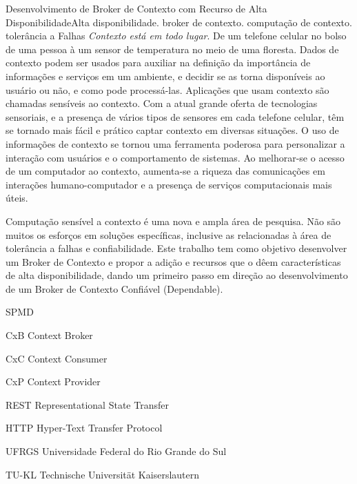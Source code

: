 \documentclass[cic,tc,english]{iiufrgs}
\begin{document}
\begin{englishabstract}{Desenvolvimento de Broker de Contexto com Recurso de Alta Disponibilidade}{Alta disponibilidade. broker de contexto. computação de contexto. tolerância a Falhas}
    \emph{Contexto está em todo lugar}. De um telefone celular no bolso de uma pessoa à um sensor de temperatura no meio de uma floresta. Dados de contexto podem ser usados para auxiliar na definição da importância de informações e serviços em um ambiente, e decidir se as torna disponíveis ao usuário ou não, e como pode processá-las. Aplicações que usam contexto são chamadas sensíveis ao contexto. Com a atual grande oferta de tecnologias sensoriais, e a presença de vários tipos de sensores em cada telefone celular, têm se tornado mais fácil e prático captar contexto em diversas situações. O uso de informações de contexto se tornou uma ferramenta poderosa para personalizar a interação com usuários e o comportamento de sistemas. Ao melhorar-se o acesso de um computador ao contexto, aumenta-se a riqueza das comunicações em interações humano-computador e a presença de serviços computacionais mais úteis.
    
    Computação sensível a contexto é uma nova e ampla área de pesquisa. Não são muitos os esforços em soluções específicas, inclusive as relacionadas à área de tolerância a falhas e confiabilidade.
    Este trabalho tem como objetivo desenvolver um Broker de Contexto e propor a adição e recursos que o dêem características de alta disponibilidade, dando um primeiro passo em direção ao desenvolvimento de um Broker de Contexto  Confiável (Dependable).
\end{englishabstract}

\listoffigures


\begin{listofabbrv}{SPMD}
    \item[CxB] Context Broker
    \item[CxC] Context Consumer
    \item[CxP] Context Provider
    \item[REST] Representational State Transfer
    \item[HTTP] Hyper-Text Transfer Protocol
    \item[UFRGS] Universidade Federal do Rio Grande do Sul
    \item[TU-KL] Technische Universität Kaiserslautern
    
\end{listofabbrv}
\end{document}
